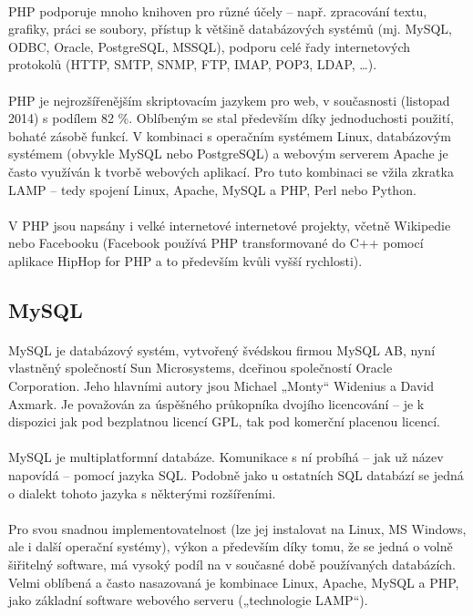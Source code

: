 \paragraph{}
PHP podporuje mnoho knihoven pro různé účely – např. zpracování textu, grafiky, práci se soubory, přístup k většině databázových systémů (mj. MySQL, ODBC, Oracle, PostgreSQL, MSSQL), podporu celé řady internetových protokolů (HTTP, SMTP, SNMP, FTP, IMAP, POP3, LDAP, …).
\paragraph{}
PHP je nejrozšířenějším skriptovacím jazykem pro web, v současnosti (listopad 2014) s podílem 82 \%. Oblíbeným se stal především díky jednoduchosti použití, bohaté zásobě funkcí. V kombinaci s operačním systémem Linux, databázovým systémem (obvykle MySQL nebo PostgreSQL) a webovým serverem Apache je často využíván k tvorbě webových aplikací. Pro tuto kombinaci se vžila zkratka LAMP – tedy spojení Linux, Apache, MySQL a PHP, Perl nebo Python.
\paragraph{}
V PHP jsou napsány i velké internetové internetové projekty, včetně Wikipedie nebo Facebooku (Facebook používá PHP transformované do C++ pomocí aplikace HipHop for PHP a to především kvůli vyšší rychlosti).

\subsection{MySQL}
\paragraph{}
MySQL je databázový systém, vytvořený švédskou firmou MySQL AB, nyní vlastněný společností Sun Microsystems, dceřinou společností Oracle Corporation. Jeho hlavními autory jsou Michael „Monty“ Widenius a David Axmark. Je považován za úspěšného průkopníka dvojího licencování – je k dispozici jak pod bezplatnou licencí GPL, tak pod komerční placenou licencí.
\paragraph{}
MySQL je multiplatformní databáze. Komunikace s ní probíhá – jak už název napovídá – pomocí jazyka SQL. Podobně jako u ostatních SQL databází se jedná o dialekt tohoto jazyka s některými rozšířeními.
\paragraph{}
Pro svou snadnou implementovatelnost (lze jej instalovat na Linux, MS Windows, ale i další operační systémy), výkon a především díky tomu, že se jedná o volně šiřitelný software, má vysoký podíl na v současné době používaných databázích. Velmi oblíbená a často nasazovaná je kombinace Linux, Apache, MySQL a PHP, jako základní software webového serveru („technologie LAMP“).
